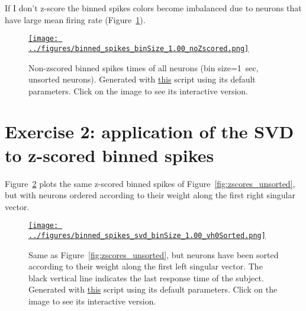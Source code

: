 \documentclass[12pt]{article}
\begin{document}
If I don't z-score the binned spikes colors become imbalanced due to neurons that
have large mean firing rate (Figure~\ref{fig:zscores_unsorted_noZscored}).

\begin{figure}[H]
    \begin{center}
        \href{https://www.gatsby.ucl.ac.uk/~rapela/neuroinformatics/2023/ws5/figures/binned_spikes_binSize_1.00_noZscored.html}{\texttt{[image: ../figures/binned\_spikes\_binSize\_1.00\_noZscored.png]}}

        \caption{Non-zscored binned spikes times of all neurons (bin
        size=1~sec, unsorted neurons).  Generated with
        \href{https://github.com/joacorapela/neuroinformatics23/blob/master/worksheets/ws5/mySolution/code/scripts/doEx1Plotly.py}{this}
        script using its default parameters. Click on the image to see its
        interactive version.}

        \label{fig:zscores_unsorted_noZscored}
    \end{center}
\end{figure}

\section*{Exercise 2: application of the SVD to z-scored binned spikes}

Figure~\ref{fig:zscores_vh0Sorted} plots the same z-scored binned spikes of
Figure~\ref{fig:zscores_unsorted}, but with neurons ordered according to their
weight along the first right singular vector.


\begin{figure}[H]
    \begin{center}
        \href{https://www.gatsby.ucl.ac.uk/~rapela/neuroinformatics/2023/ws5/figures/binned_spikes_svd_binSize_1.00_vh0Sorted.html}{\texttt{[image: ../figures/binned\_spikes\_svd\_binSize\_1.00\_vh0Sorted.png]}}

        \caption{Same as Figure~\ref{fig:zscores_unsorted}, but neurons have
        been sorted according to their weight along the first left singular
        vector. The black vertical line indicates the last response time of the
        subject. Generated with
        \href{https://github.com/joacorapela/neuroinformatics23/blob/master/worksheets/ws5/mySolution/code/scripts/doEx2Plotly.py}{this}
        script using its default parameters. Click on the image to see its
        interactive version.}

        \label{fig:zscores_vh0Sorted}
    \end{center}
\end{figure}
\end{document}
